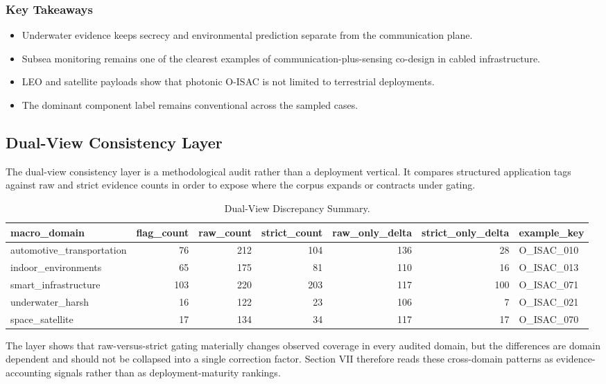 \subsubsection{Key Takeaways}
\begin{itemize}
\item Underwater evidence keeps secrecy and environmental prediction separate from the communication plane.
\item Subsea monitoring remains one of the clearest examples of communication-plus-sensing co-design in cabled infrastructure.
\item LEO and satellite payloads show that photonic O-ISAC is not limited to terrestrial deployments.
\item The dominant component label remains conventional across the sampled cases.
\end{itemize}

\subsection{Dual-View Consistency Layer}
\label{subsec:apps-dualview}

The dual-view consistency layer is a methodological audit rather than a deployment vertical. It compares structured application tags against raw and strict evidence counts in order to expose where the corpus expands or contracts under gating.

\begin{table}[!t]
\caption{Dual-View Discrepancy Summary.}
\label{tab:dualview-summary}
\centering
\scriptsize
\begin{tabular}{lrrrrrl}
\toprule
macro\_domain & flag\_count & raw\_count & strict\_count & raw\_only\_delta & strict\_only\_delta & example\_key \\
\midrule
automotive\_transportation & 76 & 212 & 104 & 136 & 28 & O\_ISAC\_010 \\
indoor\_environments & 65 & 175 & 81 & 110 & 16 & O\_ISAC\_013 \\
smart\_infrastructure & 103 & 220 & 203 & 117 & 100 & O\_ISAC\_071 \\
underwater\_harsh & 16 & 122 & 23 & 106 & 7 & O\_ISAC\_021 \\
space\_satellite & 17 & 134 & 34 & 117 & 17 & O\_ISAC\_070 \\
\bottomrule
\end{tabular}
\end{table}

The layer shows that raw-versus-strict gating materially changes observed coverage in every audited domain, but the differences are domain dependent and should not be collapsed into a single correction factor. Section VII therefore reads these cross-domain patterns as evidence-accounting signals rather than as deployment-maturity rankings.

